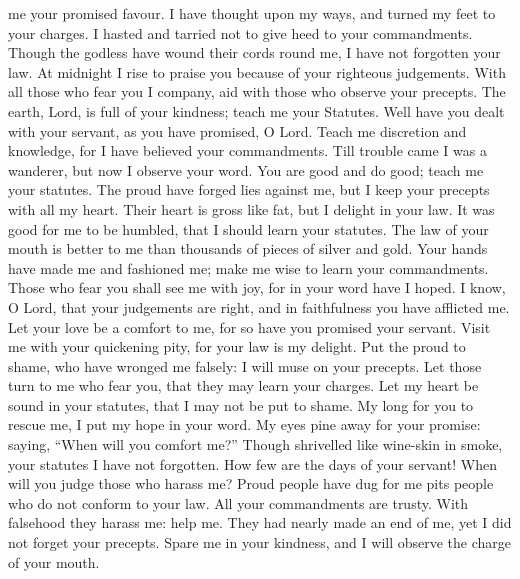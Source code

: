 me your promised favour.  I have thought upon my ways, and
turned my feet to your charges.  I hasted and tarried not
to give heed to your commandments.  Though the godless have
wound their cords round me, I have not forgotten your law. 
At midnight I rise to praise you because of your righteous judgements.
 With all those who fear you I company, aid with those who
observe your precepts.  The earth, Lord, is full of your
kindness; teach me your Statutes.  Well have you dealt with
your servant, as you have promised, O Lord.  Teach me
discretion and knowledge, for I have believed your commandments.
 Till trouble came I was a wanderer, but now I observe your
word.  You are good and do good; teach me your statutes.
 The proud have forged lies against me, but I keep your
precepts with all my heart.  Their heart is gross like fat,
but I delight in your law.  It was good for me to be
humbled, that I should learn your statutes.  The law of
your mouth is better to me than thousands of pieces of silver and gold.
 Your hands have made me and fashioned me; make me wise to
learn your commandments.  Those who fear you shall see me
with joy, for in your word have I hoped.  I know, O Lord,
that your judgements are right, and in faithfulness you have afflicted
me.  Let your love be a comfort to me, for so have you
promised your servant.  Visit me with your quickening pity,
for your law is my delight.  Put the proud to shame, who
have wronged me falsely: I will muse on your precepts.  Let
those turn to me who fear you, that they may learn your charges.
 Let my heart be sound in your statutes, that I may not be
put to shame.  My long for you to rescue me, I put my hope
in your word.  My eyes pine away for your promise: saying,
``When will you comfort me?''  Though shrivelled like
wine-skin in smoke, your statutes I have not forgotten. 
How few are the days of your servant! When will you judge those who
harass me?  Proud people have dug for me pits people who do
not conform to your law.  All your commandments are trusty.
With falsehood they harass me: help me.  They had nearly
made an end of me, yet I did not forget your precepts. 
Spare me in your kindness, and I will observe the charge of your mouth.
